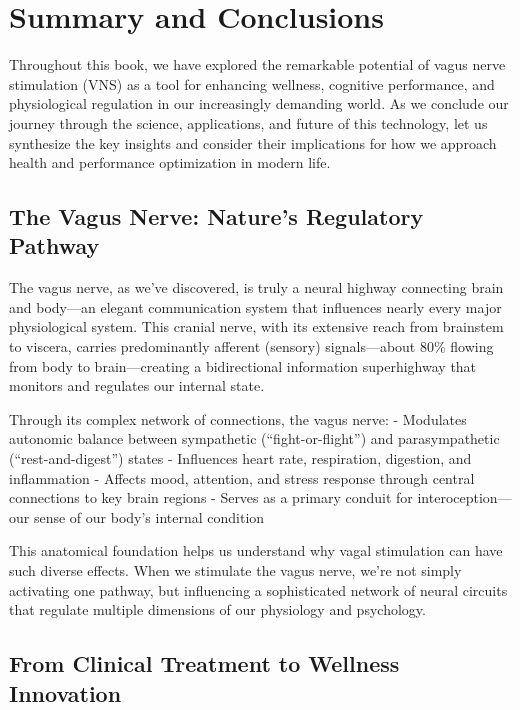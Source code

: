 \documentclass[
  Letterpaper,
]{scrbook}
\begin{document}

\chapter{Summary and Conclusions}\label{summary-and-conclusions}

Throughout this book, we have explored the remarkable potential of vagus
nerve stimulation (VNS) as a tool for enhancing wellness, cognitive
performance, and physiological regulation in our increasingly demanding
world. As we conclude our journey through the science, applications, and
future of this technology, let us synthesize the key insights and
consider their implications for how we approach health and performance
optimization in modern life.

\section{The Vagus Nerve: Nature's Regulatory
Pathway}\label{the-vagus-nerve-natures-regulatory-pathway}

The vagus nerve, as we've discovered, is truly a neural highway
connecting brain and body---an elegant communication system that
influences nearly every major physiological system. This cranial nerve,
with its extensive reach from brainstem to viscera, carries
predominantly afferent (sensory) signals---about 80\% flowing from body
to brain---creating a bidirectional information superhighway that
monitors and regulates our internal state.

Through its complex network of connections, the vagus nerve: - Modulates
autonomic balance between sympathetic (``fight-or-flight'') and
parasympathetic (``rest-and-digest'') states - Influences heart rate,
respiration, digestion, and inflammation - Affects mood, attention, and
stress response through central connections to key brain regions -
Serves as a primary conduit for interoception---our sense of our body's
internal condition

This anatomical foundation helps us understand why vagal stimulation can
have such diverse effects. When we stimulate the vagus nerve, we're not
simply activating one pathway, but influencing a sophisticated network
of neural circuits that regulate multiple dimensions of our physiology
and psychology.

\section{From Clinical Treatment to Wellness
Innovation}\label{from-clinical-treatment-to-wellness-innovation}
\end{document}
